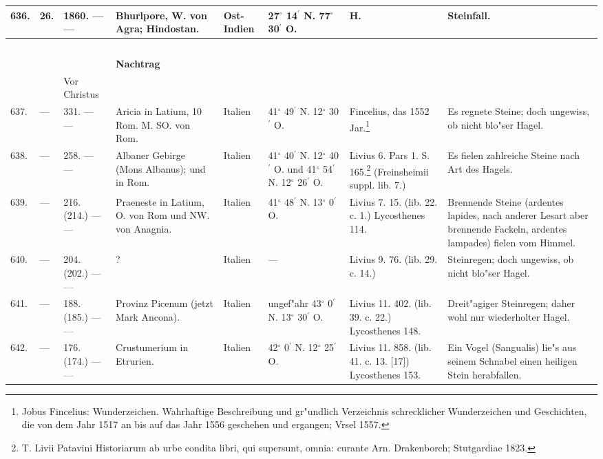 \documentclass[a4paper, 8pt, oneside, polutonikogreek, german]{article}
\begin{document}
\begin{center}
\begin{longtable}{| p{5mm} | p{3mm} | p{15mm} | p{25mm} | p{20mm} | p{14mm} | p{17mm} | p{24mm} |}
        636. & 26. & 1860. --- --- & Bhurlpore, W. von Agra; Hindostan. & Ost-Indien & 27$^\circ$ 14$^\prime$ N. 77$^\circ$ 30$^\prime$ O. & H. & Steinfall. \\ \hline
         ~ & ~ & ~&   &   &   &   &   \\
        ~ & ~ & ~ & \textbf{Nachtrag} &   &   &   &   \\ \hline
         ~ & ~ & Vor Christus &   &   &   &   &   \\ \hline
        637. & --- & 331. --- --- & Aricia in Latium, 10 Rom. M. SO. von Rom. & Italien & 41$^\circ$ 49$^\prime$ N. 12$^\circ$ 30$^\prime$ O. & Fincelius, das 1552 Jar.\footnote{Jobus Fincelius: Wunderzeichen. Wahrhaftige Beschreibung und gr"undlich Verzeichnis schrecklicher Wunderzeichen und Geschichten, die von dem Jahr 1517 an bis auf das Jahr 1556 geschehen und ergangen; Vrsel 1557.} & Es regnete Steine; doch ungewiss, ob nicht blo"ser Hagel. \\ \hline
        638. & --- & 258. --- --- & Albaner Gebirge (Mons Albanus); und in Rom. & Italien & 41$^\circ$ 40$^\prime$ N. 12$^\circ$ 40$^\prime$ O. und 41$^\circ$ 54$^\prime$ N. 12$^\circ$ 26$^\prime$ O. & Livius 6. Pars 1. S. 165.\footnote{T. Livii Patavini Historiarum ab urbe condita libri, qui supersunt, omnia: curante Arn. Drakenborch; Stutgardiae 1823.} (Freinsheimii suppl. lib. 7.) & Es fielen zahlreiche Steine nach Art des Hagels. \\ \hline
        639. & --- & 216. (214.) --- --- & Praeneste in Latium, O. von Rom und NW. von Anagnia. & Italien & 41$^\circ$ 48$^\prime$ N. 13$^\circ$ 0$^\prime$ O. & Livius 7. 15. (lib. 22. c. 1.) Lycosthenes 114. & Brennende Steine (ardentes lapides, nach anderer Lesart aber brennende Fackeln, ardentes lampades) fielen vom Himmel. \\ \hline
        640. & --- & 204. (202.) --- --- & ? & Italien & --- & Livius 9. 76. (lib. 29. c. 14.) & Steinregen; doch ungewiss, ob nicht blo"ser Hagel. \\ \hline
        641. & --- & 188. (185.) --- --- & Provinz Picenum (jetzt Mark Ancona). & Italien & ungef"ahr 43$^\circ$ 0$^\prime$ N. 13$^\circ$ 30$^\prime$ O. & Livius 11. 402. (lib. 39. c. 22.) Lycosthenes 148. & Dreit"agiger Steinregen; daher wohl nur wiederholter Hagel. \\ \hline
        642. & --- & 176. (174.) --- --- & Crustumerium in Etrurien. & Italien & 42$^\circ$ 0$^\prime$ N. 12$^\circ$ 25$^\prime$ O. & Livius 11. 858. (lib. 41. c. 13. [17]) Lycosthenes 153. & Ein Vogel (Sangualis) lie"s aus seinem Schnabel einen heiligen Stein herabfallen. \\ \hline

\end{longtable}
\end{center}
\end{document}
